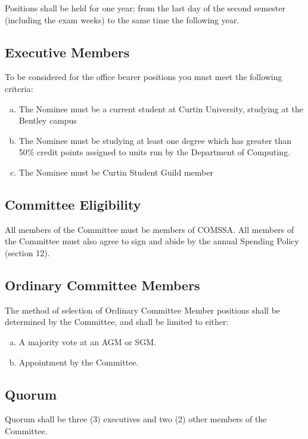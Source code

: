 \documentclass[a4paper,12pt]{article}
\begin{document}
Positions shall be held for one year; from the last day of the second semester (including the exam weeks) to the same time the following year.

\subsection{Executive Members}

To be considered for the office bearer positions you must meet the following criteria:

\begin{enumerate}[a)]
	\item The Nominee must be a current student at Curtin University, studying at the Bentley campus
	\item The Nominee must be studying at least one degree which has greater than 50\% credit points assigned to units run by the Department of Computing.
	\item The Nominee must be Curtin Student Guild member
\end{enumerate}

\subsection{Committee Eligibility}

All members of the Committee must be members of COMSSA. All members of the Committee must also agree to sign and abide by the annual Spending Policy (section 12).

\subsection{Ordinary Committee Members}

The method of selection of Ordinary Committee Member positions shall be determined by the Committee, and shall be limited to either:

\begin{enumerate}[a)]
	\item A majority vote at an AGM or SGM.
	\item Appointment by the Committee.
\end{enumerate}

\subsection{Quorum}

Quorum shall be three (3) executives and two (2) other members of the Committee.
\end{document}
